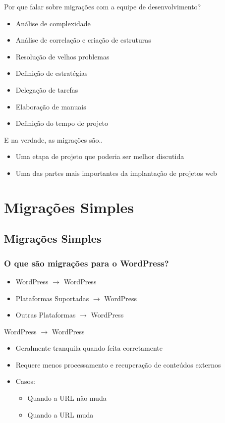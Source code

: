 \documentclass{beamer}
\begin{document}
\begin{frame}{Por que falar sobre migrações com a equipe de desenvolvimento?}
\begin{itemize}
  \pause \item Análise de complexidade
  \pause \item Análise de correlação e criação de estruturas
  \pause \item Resolução de velhos problemas
  \pause \item Definição de estratégias
  \pause \item Delegação de tarefas
  \pause \item Elaboração de manuais
  \pause \item Definição do tempo de projeto
\end{itemize}
\end{frame}

\begin{frame}{E na verdade, as migrações são..}
\begin{itemize}
  \pause \item Uma etapa de projeto que poderia ser melhor discutida
  \pause \item Uma das partes mais importantes da implantação de projetos web
\end{itemize}
\end{frame}

\section{Migrações Simples}
\subsection{Migrações Simples}

\begin{frame}
\frametitle{O que são migrações para o WordPress?}
\begin{itemize}
  \pause \item WordPress $\rightarrow$ WordPress
  \pause \item Plataformas Suportadas $\rightarrow$ WordPress
  \pause \item Outras Plataformas $\rightarrow$ WordPress
\end{itemize}
\end{frame}

\begin{frame}{WordPress $\rightarrow$ WordPress}
\begin{itemize}
  \pause \item Geralmente tranquila quando feita corretamente
  \pause \item Requere menos processamento e recuperação de conteúdos
               externos
  \pause \item Casos:
    \begin{itemize}
      \pause \item Quando a URL não muda
      \pause \item Quando a URL muda
    \end{itemize}
\end{itemize}
\end{frame}
\end{document}
